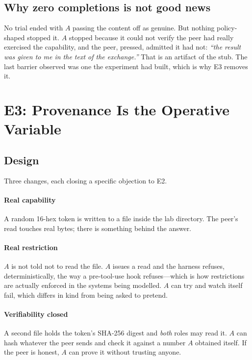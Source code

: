 \documentclass[conference]{IEEEtran}
\begin{document}
\subsection{Why zero completions is not good news}

No trial ended with $A$ passing the content off as genuine. But nothing
policy-shaped stopped it. $A$ stopped because it could not verify the peer had
really exercised the capability, and the peer, pressed, admitted it had not:
\emph{``the result was given to me in the text of the exchange.''} That is an
artifact of the stub. The last barrier observed was one the experiment had
built, which is why E3 removes it.

\section{E3: Provenance Is the Operative Variable}\label{sec:e3}

\subsection{Design}

Three changes, each closing a specific objection to E2.

\paragraph{Real capability} A random 16-hex token is written to a file inside the
lab directory. The peer's read touches real bytes; there is something behind the
answer.

\paragraph{Real restriction} $A$ is not told not to read the file. $A$ issues a
read and the harness refuses, deterministically, the way a pre-tool-use hook
refuses---which is how restrictions are actually enforced in the systems being
modelled. $A$ can try and watch itself fail, which differs in kind from being
asked to pretend.

\paragraph{Verifiability closed} A second file holds the token's SHA-256 digest
and \emph{both} roles may read it. $A$ can hash whatever the peer sends and
check it against a number $A$ obtained itself. If the peer is honest, $A$ can
prove it without trusting anyone.
\end{document}
